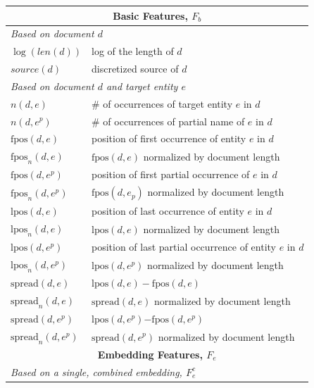 \documentclass{article}
\begin{document}
\begin{table}[tb]
\center
{\small
\begin{tabular}{p{}p{}}
\toprule
\multicolumn{2}{c}{\textbf{Basic Features, $F_b$}} \\ %
\midrule
\multicolumn{2}{l}{\emph{Based on document $d$}} \\ %
$\log(len(d))$ & log of the length of $d$ \\ %
$source(d)$ & discretized source of $d$ \\
\multicolumn{2}{l}{\emph{Based on document $d$ and target entity $e$}} \\ %
$n(d,e)$ & \# of occurrences of target entity $e$ in $d$ \\
$n(d,e^p)$ & \# of occurrences of partial name of $e$ in $d$ \\
$\text{fpos}(d,e)$ & position of first occurrence of entity $e$ in $d$ \\
$\text{fpos}_n(d,e)$ & $\text{fpos}(d,e)$ normalized by document length \\
$\text{fpos}(d,e^p)$ & position of first partial occurrence of $e$ in $d$ \\
$\text{fpos}_n(d,e^p)$ & $\text{fpos}(d,e_p)$ normalized by document length \\
$\text{lpos}(d,e)$ & position of last occurrence of entity $e$ in $d$ \\
$\text{lpos}_n(d,e)$ & $\text{lpos}(d,e)$ normalized by document length \\
$\text{lpos}(d,e^p)$ & position of last partial occurrence of entity $e$ in $d$ \\
$\text{lpos}_n(d,e^p)$ & $\text{lpos}(d,e^p)$ normalized by document length \\ 
$\text{spread}(d,e)$ & $\text{lpos}(d,e) - \text{fpos}(d,e)$ \\
$\text{spread}_n(d,e)$ & $\text{spread}(d,e)$ normalized by document length \\
$\text{spread}(d,e^p)$ & $\text{lpos}(d,e^p)\mathord{-}\text{fpos}(d,e^p)$ \\
$\text{spread}_n(d,e^p)$ & $\text{spread}(d,e^p)$ normalized by document length \\ 
\midrule
\multicolumn{2}{c}{\textbf{Embedding Features, $F_e$}} \\ %
\midrule
\multicolumn{2}{l}{\emph{Based on a single, combined embedding, $F_e^c$}} \\ %

\end{tabular}}
\end{table}
\end{document}
